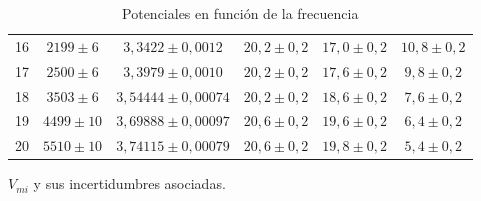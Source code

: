 \documentclass[11pt]{report}
\begin{document}
\begin{refsection}
\begin{table}[H]
\begin{threeparttable}
\begin{tabular}{|c|c|c|c|c|c|}
16 & $2199 \pm 6$ & $3,3422 \pm 0,0012$ & $20,2 \pm 0,2$ & $17,0 \pm 0,2$ & $10,8 \pm 0,2$ \\
17 & $2500 \pm 6$ & $3,3979 \pm 0,0010$ & $20,2 \pm 0,2$ & $17,6 \pm 0,2$ & $9,8 \pm 0,2$ \\
18 & $3503 \pm 6$ & $3,54444 \pm 0,00074$ & $20,2 \pm 0,2$ & $18,6 \pm 0,2$ & $7,6 \pm 0,2$ \\
19 & $4499 \pm 10$ & $3,69888 \pm 0,00097$ & $20,6 \pm 0,2$ & $19,6 \pm 0,2$ & $6,4 \pm 0,2$ \\
20 & $5510 \pm 10$ & $3,74115 \pm 0,00079$ & $20,6 \pm 0,2$ & $19,8 \pm 0,2$ & $5,4 \pm 0,2$ \\
\hline
\end{tabular}
\begin{tablenotes}
\item[$\dagger$] $V_{mi}$ y sus incertidumbres asociadas.
\end{tablenotes}
\end{threeparttable}
\caption{Potenciales en función de la frecuencia}
\label{tab:Potenciales vs. frecuencia}
\end{table}


\end{refsection}
\end{document}
